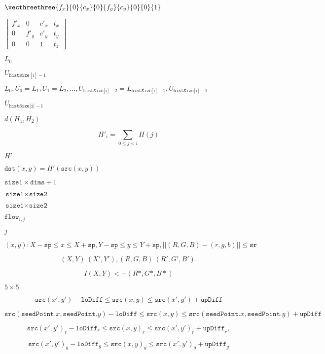 \documentclass{article}
\begin{document}
$\vecthreethree{f_x}{0}{c_x}{0}{f_y}{c_y}{0}{0}{1}$
\pagebreak

$\begin{bmatrix} {f'}_x & 0 & {c'}_x & t_x \\ 0 & {f'}_y & {c'}_y & t_y \\ 0 & 0 & 1 & t_z \end{bmatrix}$
\pagebreak

$L_0$
\pagebreak

$U_{\texttt{histSize}[i]-1}$
\pagebreak

$L_0, U_0=L_1, U_1=L_2, ..., U_{\texttt{histSize[i]}-2}=L_{\texttt{histSize[i]}-1}, U_{\texttt{histSize[i]}-1}$
\pagebreak

$U_{\texttt{histSize[i]}-1}$
\pagebreak

$d(H_1, H_2)$
\pagebreak

\[H'_i = \sum _{0 \le j < i} H(j)\]
\pagebreak

$H'$
\pagebreak

$\texttt{dst}(x,y) = H'(\texttt{src}(x,y))$
\pagebreak

$\texttt{size1}\times \texttt{dims}+1$
\pagebreak

$\texttt{size1}\times \texttt{size2}$
\pagebreak

$\texttt{size1} \times \texttt{size2}$
\pagebreak

$\texttt{flow}_{i,j}$
\pagebreak

$j$
\pagebreak

\[(x,y): X- \texttt{sp} \le x \le X+ \texttt{sp} , Y- \texttt{sp} \le y \le Y+ \texttt{sp} , ||(R,G,B)-(r,g,b)|| \le \texttt{sr}\]
\pagebreak

\[(X,Y)~(X',Y'), (R,G,B)~(R',G',B').\]
\pagebreak

\[I(X,Y) <- (R*,G*,B*)\]
\pagebreak

$5\times 5$
\pagebreak

\[\texttt{src} (x',y')- \texttt{loDiff} \leq \texttt{src} (x,y) \leq \texttt{src} (x',y')+ \texttt{upDiff}\]
\pagebreak

\[\texttt{src} ( \texttt{seedPoint} .x, \texttt{seedPoint} .y)- \texttt{loDiff} \leq \texttt{src} (x,y) \leq \texttt{src} ( \texttt{seedPoint} .x, \texttt{seedPoint} .y)+ \texttt{upDiff}\]
\pagebreak

\[\texttt{src} (x',y')_r- \texttt{loDiff} _r \leq \texttt{src} (x,y)_r \leq \texttt{src} (x',y')_r+ \texttt{upDiff} _r,\]
\pagebreak

\[\texttt{src} (x',y')_g- \texttt{loDiff} _g \leq \texttt{src} (x,y)_g \leq \texttt{src} (x',y')_g+ \texttt{upDiff} _g\]
\pagebreak
\end{document}
